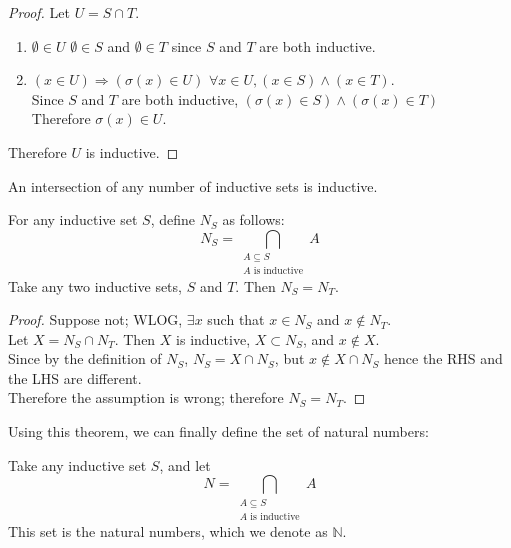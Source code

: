 \documentclass{report}
\begin{document}
		\begin{proof}
			Let $U=S \cap T$.
			\begin{enumerate}
				\item $\emptyset \in U$
				\subitem $\emptyset \in S$ and $\emptyset \in T$ since $S$ and $T$ are both inductive.
				\item $(x \in U) \Rightarrow (\sigma(x) \in U)$
				\subitem $\forall x \in U, (x \in S) \wedge (x \in T)$.\\
				Since $S$ and $T$ are both inductive, $(\sigma(x) \in S) \wedge (\sigma(x) \in T)$\\
				Therefore $\sigma(x) \in U$.
			\end{enumerate} 
			Therefore $U$ is inductive.
		\end{proof}
		
		\begin{coro}
			An intersection of any number of inductive sets is inductive.
		\end{coro}
		
		\begin{thm}
			For any inductive set $S$, define $N_S$ as follows:
			\begin{displaymath}
			N_S=\bigcap_{\substack{A \subseteq S\\A \text{ is inductive}}}A
			\end{displaymath}
			Take any two inductive sets, $S$ and $T$. Then $N_S=N_T$.
		\end{thm}
		
		\begin{proof}
			Suppose not; WLOG, $\exists x$ such that $x \in N_S$ and $x \notin N_T$.\\
			Let $X=N_S \cap N_T$. Then $X$ is inductive, $X \subset N_S$, and $x \notin X$.\\
			Since by the definition of $N_S$, $N_S=X \cap N_S$, but $x \notin X \cap N_S$ hence the RHS and the LHS are different.\\
			Therefore the assumption is wrong; therefore $N_S=N_T$.
		\end{proof}
		
		Using this theorem, we can finally define the set of natural numbers:
		\begin{defn} \label{def_N}
			Take any inductive set $S$, and let
			\begin{displaymath}
			N=\bigcap_{\substack{A \subseteq S\\A \text{ is inductive}}}A
			\end{displaymath}
			This set is the natural numbers, which we denote as $\mathbb{N}$.
		\end{defn}
		
\end{document}
